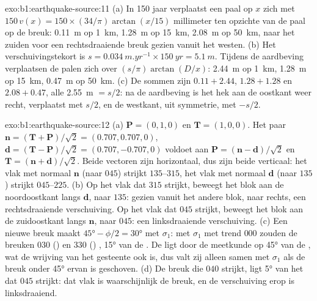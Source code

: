 \begin{solution}{exo:b1:earthquake-source:11}
(a) In 150 jaar verplaatst een paal op $x$ zich met $150\,v(x) = 150\times(34/\pi)
\arctan(x/15)$ millimeter ten opzichte van de paal op de breuk: \qty{0.11}{m} op
\qty{1}{km}, \qty{1.28}{m} op \qty{15}{km}, \qty{2.08}{m} op \qty{50}{km}, naar het zuiden
voor een rechtsdraaiende breuk gezien vanuit het westen. (b) Het verschuivingstekort is
$s = \qty{0.034}{m.yr^{-1}}\times\qty{150}{yr} = \qty{5.1}{m}$. Tijdens de aardbeving
verplaatsen de palen zich over $(s/\pi)\arctan(D/x)$: \qty{2.44}{m} op \qty{1}{km},
\qty{1.28}{m} op \qty{15}{km}, \qty{0.47}{m} op \qty{50}{km}. (c) De sommen zijn
$0.11 + 2.44$, $1.28 + 1.28$ en $2.08 + 0.47$, alle \qty{2.55}{m} $= s/2$: na de
aardbeving is het hek aan de oostkant weer recht, verplaatst met $s/2$, en de westkant,
uit symmetrie, met $-s/2$.
\end{solution}

\begin{solution}{exo:b1:earthquake-source:12}
(a) $\mathbf P = (0, 1, 0)$ en $\mathbf T = (1, 0, 0)$. Het paar
$\mathbf n = (\mathbf T + \mathbf P)/\sqrt2 = (0.707, 0.707, 0)$,
$\mathbf d = (\mathbf T - \mathbf P)/\sqrt2 = (0.707, -0.707, 0)$ voldoet aan
$\mathbf P = (\mathbf n - \mathbf d)/\sqrt2$ en $\mathbf T = (\mathbf n +
\mathbf d)/\sqrt2$. Beide vectoren zijn horizontaal, dus zijn beide 
verticaal: het vlak met normaal $\mathbf n$ (naar $045$) strijkt $135$--$315$, het vlak
met normaal $\mathbf d$ (naar $135$) strijkt $045$--$225$. (b) Op het vlak dat $315$
strijkt, beweegt het blok aan de noordoostkant langs $\mathbf d$, naar $135$: gezien
vanuit het andere blok, naar rechts, een rechtsdraaiende verschuiving. Op het vlak dat
$045$ strijkt, beweegt het blok aan de zuidoostkant langs $\mathbf n$, naar $045$: een
linksdraaiende verschuiving. (c) Een nieuwe breuk maakt $\ang{45} - \phi/2 =
\ang{30}$ met $\sigma_1$: met $\sigma_1$ met trend $000$ zouden de breuken $030$
() en $330$ () , \ang{15} van de . De  ligt
door de meetkunde op \ang{45} van de , wat de wrijving van het gesteente ook
is, dus valt zij alleen samen met $\sigma_1$ als de breuk onder \ang{45} ervan is
geschoven. (d) De breuk die $040$ strijkt, ligt \ang{5} van het  dat $045$
strijkt: dat vlak is waarschijnlijk de breuk, en de verschuiving erop is
linksdraaiend.
\end{solution}


